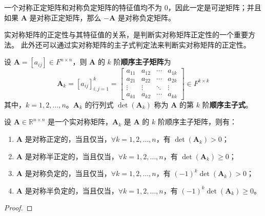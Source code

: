 \begin{corollary}
    一个对称正定矩阵和对称负定矩阵的特征值均不为 0，因此一定是可逆矩阵；并且如果 $\mathbf{A}$ 是对称正定矩阵，那么 $-\mathbf{A}$ 是对称负定矩阵。
\end{corollary}

\begin{note}
    实对称矩阵的正定性与其特征值的关系，是判断实对称矩阵正定性的一个重要方法。
    此外还可以通过实对称矩阵的主子式判定法来判断实对称矩阵的正定性。
\end{note}
\vspace{1em}

\begin{definition}
    设 $\mathbf{A} = [a_{ij}] \in F^{n \times n}$，则 $\mathbf{A}$ 的 $k$ 阶\textbf{顺序主子矩阵}为
    \[
        \mathbf{A}_k = [a_{ij}]_{i,j=1}^k = \begin{bmatrix}
            a_{11} & a_{12} & \cdots & a_{1k} \\
            a_{21} & a_{22} & \cdots & a_{2k} \\
            \vdots & \vdots & \ddots & \vdots \\
            a_{k1} & a_{k2} & \cdots & a_{kk}
        \end{bmatrix}
        \in F^{k \times k}
    \]
    其中，$k = 1,2,\ldots,n$。$\mathbf{A}_k$ 的行列式 $\det(\mathbf{A}_k)$ 称为 $\mathbf{A}$ 的第 $k$ 阶\textbf{顺序主子式}。
    \label{def:leading_principal_submatrix}
\end{definition}

\begin{proposition}[实对称矩阵的正定性的顺序主子式判定法]
    设 $\mathbf{A}\in \mathbb{R}^{n\times n}$ 是一个实对称矩阵，$\mathbf{A}_k$ 是 $\mathbf{A}$ 的 $k$ 阶顺序主子矩阵，则有：
    \begin{enumerate}
        \item $\mathbf{A}$ 是对称正定的，当且仅当，$\forall k=1,2,\ldots,n$，有 $\det(\mathbf{A}_k) > 0$；
        \item $\mathbf{A}$ 是对称半正定的，当且仅当，$\forall k=1,2,\ldots,n$，有 $\det(\mathbf{A}_k) \geq 0$；
        \item $\mathbf{A}$ 是对称负定的，当且仅当，$\forall k=1,2,\ldots,n$，有 $(-1)^k \det(\mathbf{A}_k) > 0$；
        \item $\mathbf{A}$ 是对称半负定的，当且仅当，$\forall k=1,2,\ldots,n$，有 $(-1)^k \det(\mathbf{A}_k) \geq 0$。
    \end{enumerate}
    \label{prop:real_symmetric_matrix_positive_definite_leading_principal_minor}
\end{proposition}
\begin{proof}
    
\end{proof}
\vspace{2em}

